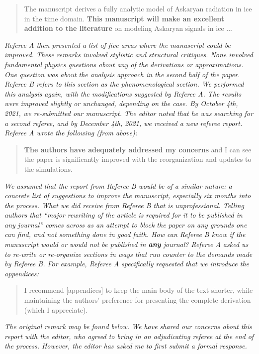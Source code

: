 \documentclass[12pt]{article}
\begin{document}
\begin{quote}
The manuscript derives a fully analytic model of Askaryan radiation in ice in the time domain. \textbf{This manuscript will make an excellent addition to the literature} on modeling Askaryan signals in ice ...
\end{quote}

\textit{Referee A then presented a list of five areas where the manuscript could be improved.  These remarks involved stylistic and structural critiques.  None involved fundamental physics questions about any of the derivations or approximations.  One question was about the analysis approach in the second half of the paper.  Referee B refers to this section as the phenomenological section.  We performed this analysis again, with the modifications suggested by Referee A.  The results were improved slightly or unchanged, depending on the case.  By October 4th, 2021, we re-submitted our manuscript.  The editor noted that he was searching for a second referee, and by December 4th, 2021, we received a new referee report.  Referee A wrote the following (from above):}

\begin{quote}
\textbf{The authors have adequately addressed my concerns} and I can see the paper is significantly improved with the reorganization and updates to the simulations.
\end{quote}

\textit{We assumed that the report from Referee B would be of a similar nature: a concrete list of suggestions to improve the manuscript, especially six months into the process.  What we did receive from Referee B that is unprofessional.  Telling authors that ``major rewriting of the article is required for it to be published in any journal'' comes across as an attempt to block the paper on any grounds one can find, and not something done in good faith.  How can Referee B know if the manuscript would or would not be published in \textbf{any} journal?  Referee A asked us to re-write or re-organize sections in ways that run counter to the demands made by Referee B.  For example, Referee A specifically requested that we introduce the appendices:}

\begin{quote}
I recommend [appendices] to keep the main body of the text shorter, while maintaining the authors’ preference for presenting the complete derivation (which I appreciate).
\end{quote}

\textit{The original remark may be found below.  We have shared our concerns about this report with the editor, who agreed to bring in an adjudicating referee at the end of the process.  However, the editor has asked me to first submit a formal response.}
\end{document}

